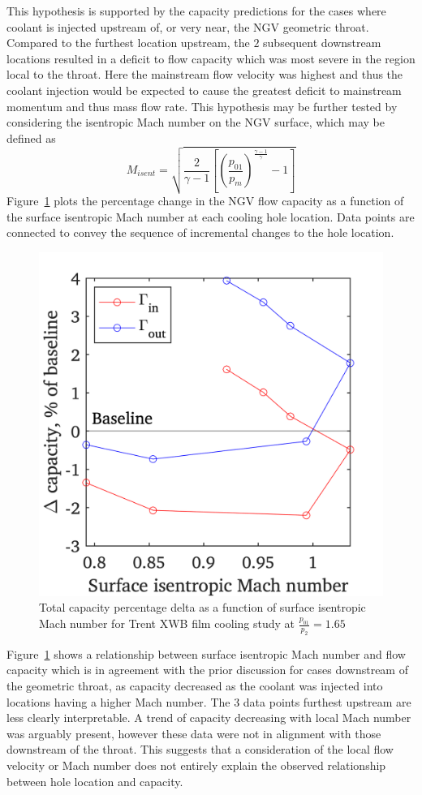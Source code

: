 \documentclass[a4paper, 11pt, oneside]{report}
\begin{document}
This hypothesis is supported by the capacity predictions for the cases where coolant is injected upstream of, or very near, the NGV geometric throat. Compared to the furthest location upstream, the $2$ subsequent downstream locations resulted in a deficit to flow capacity which was most severe in the region local to the throat. Here the mainstream flow velocity was highest and thus the coolant injection would be expected to cause the greatest deficit to mainstream momentum and thus mass flow rate. This hypothesis may be further tested by considering the isentropic Mach number on the NGV surface, which may be defined as
\begin{equation}
M_{isent} =
\sqrt{
	\frac{2}{\gamma-1}
	\left[
		\left(
			\frac{p_{01}}{p_m}
		\right)
		^{\frac{\gamma-1}{\gamma}}
		-1
	\right]
}
\end{equation}
Figure~\ref{fig:sch_surface_isentropic_mach_number_vs_capacity} plots the percentage change in the NGV flow capacity as a function of the surface isentropic Mach number at each cooling hole location. Data points are connected to convey the sequence of incremental changes to the hole location.

\begin{figure}[H]
      \centering
      \includegraphics[width=.45\textwidth]{figs/sch_surface_isentropic_mach_number_vs_capacity.png}
      \caption{Total capacity percentage delta as a function of surface isentropic Mach number for Trent XWB film cooling study at $\frac{p_{01}}{p_2}=1.65$}
      \label{fig:sch_surface_isentropic_mach_number_vs_capacity}
\end{figure}

Figure~\ref{fig:sch_surface_isentropic_mach_number_vs_capacity} shows a relationship between surface isentropic Mach number and flow capacity which is in agreement with the prior discussion for cases downstream of the geometric throat, as capacity decreased as the coolant was injected into locations having a higher Mach number. The 3 data points furthest upstream are less clearly interpretable. A trend of capacity decreasing with local Mach number was arguably present, however these data were not in alignment with those downstream of the throat. This suggests that a consideration of the local flow velocity or Mach number does not entirely explain the observed relationship between hole location and capacity.
\end{document}
